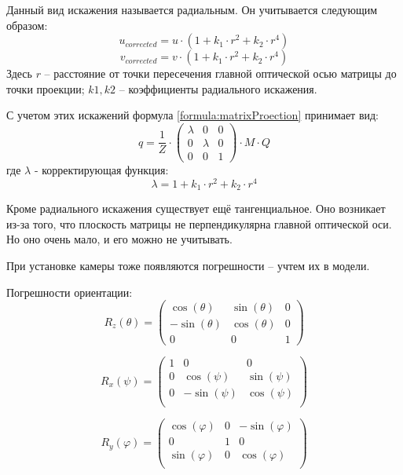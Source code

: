 Данный вид искажения называется радиальным. Он учитывается следующим образом:
$$
u_{corrected} = u \cdot (1 + k_1 \cdot r^2  + k_2 \cdot r^4 )
$$
$$
v_{corrected} = v \cdot (1 + k_1 \cdot r^2  + k_2 \cdot r^4 )
$$
Здесь $r$ – расстояние от точки пересечения главной оптической осью матрицы до точки проекции; $k1, k2$ – коэффициенты радиального искажения.

С учетом этих искажений формула \ref{formula:matrixProection} принимает вид:
\begin{equation}
\label{formula:matrixProection2}
q = \frac{1}{Z} \cdot \left( 
\begin{array}{ccc}
	\lambda & 0 & 0 \\ 
	0 & \lambda & 0 \\ 
	0 & 0 & 1
\end{array} 
\right) 
 \cdot M \cdot Q
\end{equation}
где $\lambda$ - корректирующая функция:
$$ \lambda = 1 + k_1 \cdot r^2  + k_2 \cdot r^4 $$

Кроме радиального искажения существует ещё тангенциальное. Оно возникает из-за того, что плоскость матрицы не перпендикулярна главной оптической оси. Но оно очень мало, и его можно не учитывать. 

При установке камеры тоже появляются погрешности – учтем их в модели.

Погрешности ориентации:
$$R_z(\theta) = 
\left( 
	\begin{array}{ccc}
	\cos (\theta ) & \sin (\theta ) & 0 \\ 
	- \sin (\theta ) & \cos (\theta ) & 0 \\ 
	0 & 0 & 1
\end{array} 
\right) 
$$

$$
R_x(\psi ) = 
\left( 
	\begin{array}{ccc}
	1  & 0 & 0 \\ 
	0 & \cos (\psi ) & \sin (\psi ) \\ 
	0 & - \sin (\psi ) & \cos (\psi ) \\ 
\end{array} 
\right) 
$$

$$
R_y(\varphi ) = 
\left( 
	\begin{array}{ccc}
	\cos (\varphi ) & 0 & - \sin ( \varphi )  \\ 
	0 & 1 & 0 \\ 
	\sin (\varphi ) & 0 & \cos (\varphi ) \\ 
\end{array} 
\right) 
$$

